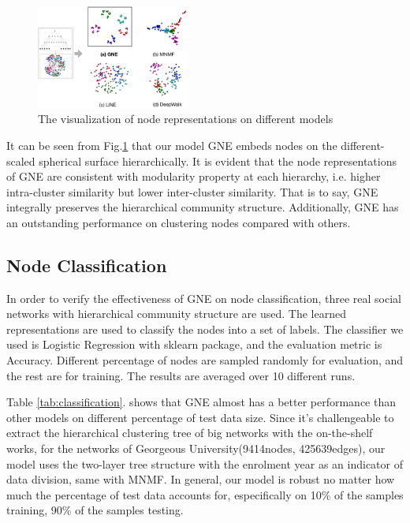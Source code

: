 \documentclass{article}
\theoremstyle{definition}
\begin{document}
	\begin{figure}[htb]
		\center
		\includegraphics[width=0.45\textwidth]{figure/visualization.pdf}
		\caption{The visualization of node representations on different models}
		\label{fig:visualization}
	\end{figure}
	It can be seen from Fig.\ref{fig:visualization} that our model GNE embeds nodes on the different-scaled spherical surface hierarchically. It is evident that the node representations of GNE are consistent with modularity property at each hierarchy, i.e. higher intra-cluster similarity but lower inter-cluster similarity. That is to say, GNE integrally preserves the hierarchical community structure. Additionally, GNE has an outstanding performance on clustering nodes compared with others.
	
	

	\subsection{Node Classification}
	In order to verify the effectiveness of GNE on node classification, three real social networks with hierarchical community structure are used. The learned representations are used to classify the nodes into a set of labels. The classifier we used is Logistic Regression with sklearn package, and the evaluation metric is Accuracy. Different percentage of nodes are sampled randomly for evaluation, and the rest are for training. The results are averaged over 10 different runs. 

	Table \ref{tab:classification}. shows that GNE almost has a better performance than other models on different percentage of test data size. Since it's challengeable to extract the hierarchical clustering tree of big networks with the on-the-shelf works, for the networks of Georgeous University(9414nodes, 425639edges), our model uses the two-layer tree structure with the enrolment year as an indicator of data division, same with MNMF. In general, our model is robust no matter how much the percentage of test data accounts for, especifically on 10\% of the samples training, 90\% of the samples testing.
 
\end{document}
